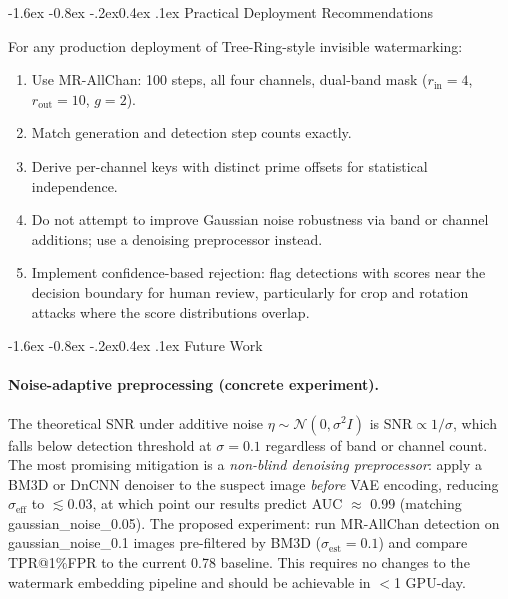 \documentclass[10pt,twocolumn]{article}
\makeatletter
\renewcommand\subsection{\@startsection{subsection}{2}{\z@}%
  {-1.6ex \@plus -0.8ex \@minus -.2ex}{0.4ex \@plus .1ex}%
  {\normalfont\normalsize\itshape}}
\makeatother
\begin{document}
\subsection{Practical Deployment Recommendations}

For any production deployment of Tree-Ring-style invisible watermarking:

\begin{enumerate}
  \item Use MR-AllChan: 100 steps, all four channels, dual-band mask
    ($r_{\mathrm{in}}{=}4$, $r_{\mathrm{out}}{=}10$, $g{=}2$).
  \item Match generation and detection step counts exactly.
  \item Derive per-channel keys with distinct prime offsets for
    statistical independence.
  \item Do not attempt to improve Gaussian noise robustness via band
    or channel additions; use a denoising preprocessor instead.
  \item Implement confidence-based rejection: flag detections with
    scores near the decision boundary for human review, particularly
    for crop and rotation attacks where the score distributions overlap.
\end{enumerate}

\subsection{Future Work}

\paragraph{Noise-adaptive preprocessing (concrete experiment).}
The theoretical SNR under additive noise $\eta \sim \mathcal{N}(0,\sigma^2 I)$
is $\mathrm{SNR} \propto 1/\sigma$, which falls below detection threshold
at $\sigma{=}0.1$ regardless of band or channel count.
The most promising mitigation is a \emph{non-blind denoising preprocessor}:
apply a BM3D or DnCNN denoiser to the suspect image \emph{before} VAE
encoding, reducing $\sigma_{\mathrm{eff}}$ to $\lesssim 0.03$, at which
point our results predict AUC $\approx$ 0.99 (matching gaussian\_noise\_0.05).
The proposed experiment: run MR-AllChan detection on gaussian\_noise\_0.1
images pre-filtered by BM3D ($\sigma_{\mathrm{est}}{=}0.1$) and compare
TPR@1\%FPR to the current 0.78 baseline.
This requires no changes to the watermark embedding pipeline and
should be achievable in $<$1 GPU-day.
\end{document}
